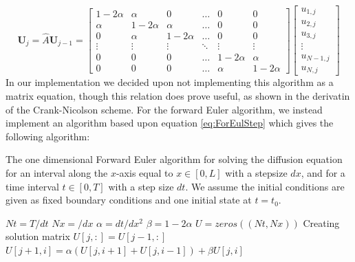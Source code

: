 \documentclass[a4paper,10pt,english]{article}
\renewcommand{\vec}[1]{\mathbf{#1}}
\begin{document}
\begin{equation}
\vec{U}_{j} = \hat{A} \vec{U}_{j-1} = \begin{bmatrix}1 - 2 \alpha & \alpha  & 0 & \hdots & 0 & 0 \\ \alpha & 1 - 2 \alpha & \alpha &  \hdots & 0 & 0 \\ 0 & \alpha & 1 - 2 \alpha  & \hdots & 0 & 0 \\ \vdots & \vdots & \vdots  & \ddots & \vdots & \vdots \\0 & 0 & 0 &  \hdots & 1 - 2\alpha &  \alpha  \\ 0 & 0 & 0 & \hdots &  \alpha  & 1 - 2\alpha \end{bmatrix}\begin{bmatrix}
u_{1,j} \\ u_{2,j} \\ u_{3,j} \\ \vdots \\ u_{N-1,j} \\ u_{N,j}
\end{bmatrix}
\label{eq:FEMatrix}
\end{equation}
In our implementation we decided upon not implementing this algorithm as a matrix equation, though this relation does prove useful, as shown in the derivatin of the Crank-Nicolson scheme. For the forward Euler algorithm, we instead implement an algorithm based upon equation \ref{eq:ForEulStep} which gives the following algorithm:
\begin{algorithm}[H]
\centering
\caption{The one dimensional Forward Euler algorithm for solving the diffusion equation for an interval along the $x$-axis equal to $x \in [0,L]$ with a stepsize $dx$, and for a time interval $t \in [0,T]$ with a step size $dt$. We assume the initial conditions are given as fixed boundary conditions and one initial state at $t=t_0$. \label{alg:FWE_1D}}
	\begin{algorithmic}[1]
		\State $Nt = T/dt$
		\State $Nx = /dx$
		\State $\alpha = dt/dx^2$
		\State $\beta = 1 - 2\alpha$
		\State $U = zeros((Nt,Nx))$
		\Comment Creating solution matrix
			\State $U[j,:] = U[j-1,:]$
				\State $U[j+1,i] = \alpha(U[j,i+1] + U[j,i-1]) + \beta U[j,i]$
			\EndFor
		\EndFor
 
	\end{algorithmic}
\end{algorithm} 
 
\end{document}
